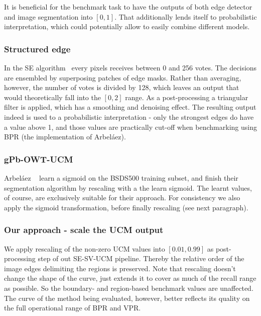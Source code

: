 It is beneficial %
for the benchmark task to have the outputs of both edge detector and image segmentation into $[0,1]$. That additionally lends itself to probabilistic interpretation, which could potentially allow to easily combine different models.

\subsubsection*{Structured edge}
In the SE algorithm~\cite{DollarICCV13edges,Dollar2015PAMI} every pixels receives between 0 and 256 votes. The decisions are ensembled by superposing patches of edge masks. Rather than averaging, however, the number of votes is divided by 128, which leaves an output that would theoretically fall into the $[0, 2]$ range. As a post-processing a triangular filter is applied, which has a smoothing and denoising effect. The resulting output indeed is used to %
a probabilistic interpretation - only the strongest edges do have a value above 1, and those values are practically cut-off when benchmarking using BPR (the implementation of Arbel\'aez\etal).

\subsubsection*{gPb-OWT-UCM}
Arbel\'aez \etal~\cite{Arbelaez11} learn a sigmoid on the BSDS500 training subset, and finish their segmentation algorithm by rescaling with a the learn sigmoid. The learnt values, of course, are exclusively suitable for their approach. For consistency we also apply the sigmoid transformation, before finally rescaling (see next paragraph).

\subsubsection*{Our approach - scale the UCM output} %
We apply rescaling of the non-zero UCM values into $[0.01, 0.99]$ as post-processing step of out SE-SV-UCM pipeline. Thereby the relative order of the image edges delimiting the regions is preserved. Note that rescaling doesn't change the shape of the curve, just extends it to cover as much of the recall range as possible. So the boundary- and region-based benchmark values are unaffected. The curve of the method being evaluated, however, better reflects its quality on the full operational range of BPR and VPR.

